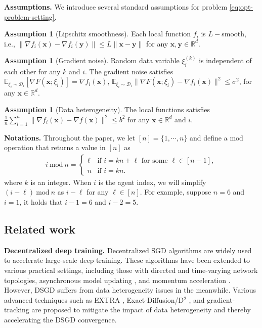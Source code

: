 \documentclass{article}
\newcommand{\bvx}{\boldsymbol{x}}
\newcommand{\bvy}{\boldsymbol{y}}
\newcommand{\ko}{{(k)}}
\newcommand{\bbR}{\mathbb{R}}
\newcommand{\bbE}{\mathbb{E}}
\newcommand{\avein}{\frac{1}{n}\sum_{i=1}^n}
\theoremstyle{plain}
\theoremstyle{definition}
\newtheorem{assumption}[theorem]{Assumption}
\begin{document}
\textbf{Assumptions. }We introduce several standard assumptions for problem \eqref{eq:opt-problem-setting}.
\begin{assumption}[\sc Lipschitz smoothness]
\label{ass:Lip}
Each local function $f_i$ is $L-$smooth, i.e., $\|\nabla f_i(\bvx)-\nabla f_i(\bvy)\|\leq L\|\bvx-\bvy\|$ for any $\bvx,\bvy\in\bbR^d$.
\end{assumption}
\begin{assumption}[\sc Gradient noise]
\label{ass:grad-noise}
Random data variable $\xi^\ko_i$ is independent of  each other for any $k$ and $i$. The gradient noise satisfies
$\bbE_{\xi_i\sim \mathcal{D}_i}[\nabla F(\bvx;\xi_i)] = \nabla f_i(\bvx)$, $\bbE_{\xi_i\sim \mathcal{D}_i}\|\nabla F(\bvx;\xi_i)-\nabla f_i(\bvx)\|^2\leq \sigma^2$, for any $\bvx\in \bbR^d$.
\end{assumption}
\begin{assumption}[\sc Data heterogeneity]
\label{ass:data-hetero}
The local functions satisfies $\avein\|\nabla f_i(\bvx)-\nabla f(\bvx)\|^2\leq b^2$ for any $\bvx\in\bbR^d$ and $i$. 
\end{assumption}

\textbf{Notations.} Throughout the paper, we let $[n] = \{1, \cdots, n\}$ and define a $\mathrm{mod}$ operation that returns a value in $[n]$ as 
\begin{align*}
i\ \mathrm{mod}\ n = 
\left\{
\begin{array}{ll}
\ell & \mbox{if $i = kn + \ell$ for some $\ell \in [n-1]$}, \\
n & \mbox{if $i = kn $}.
\end{array}
\right.
\end{align*}
where $k$ is an integer. When $i$ is the agent index, we will simplify $(i-\ell)\ \mathrm{mod}\ n $ as $i-\ell$ for any $\ell \in [n]$. For example, suppose $n=6$ and $i=1$, it holds that $i-1 = 6$ and $i-2 = 5$.

\subsection{Related work}

\textbf{Decentralized deep training.} 
Decentralized SGD algorithms \cite{lopes2008diffusion,yuan2016convergence,lian2017can,koloskova2019decentralized} are widely used to accelerate large-scale deep training. {These algorithms have been} extended to various practical settings,  {including those with} directed  \cite{assran2019stochastic} and time-varying \cite{kong2021consensus,ying2021exponential,koloskova2020unified} network topologies, asynchronous model updating \cite{lian2018asynchronous,niwa2021asynchronous}, and momentum acceleration \cite{lin2021quasi,yuan2021decentlam}. 
{However,} DSGD suffers from data heterogeneity issues \cite{koloskova2020unified,yuan2020influence} {in the meanwhile.} Various advanced techniques such as EXTRA \cite{shi2015extra}, Exact-Diffusion/D$^2$ \cite{yuan2017exact1,li2017decentralized,yuan2021removing,tang2018d}, and gradient-tracking \cite{di2016next,xu2015augmented,nedic2017achieving,qu2018harnessing,xin2020improved,alghunaim2021unified} are proposed to {mitigate the impact of} data heterogeneity and {thereby accelerating} the DSGD convergence. 
\end{document}
